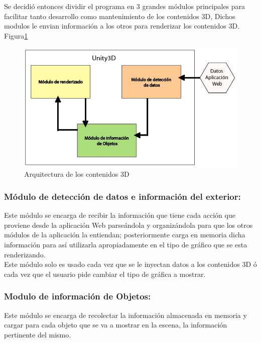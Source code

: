 \documentclass[twocolumn]{article}
\begin{document}
Se decidió entonces dividir el programa en 3 grandes módulos principales para facilitar tanto desarrollo como mantenimiento de los contenidos 3D, Dichos modulos le envian información a los otros para renderizar los contenidos 3D. Figura\ref{fig:modules}\\

\begin{figure}[h]
	\centering
		\includegraphics[scale=0.3]{ArquitecturaUnity.png}
		\caption{Arquitectura de los contenidos 3D}
	\label{fig:modules}
\end{figure}


\subsubsection{Módulo de detección de datos e información del exterior:}
Este módulo se encarga de recibir la información que tiene cada acción que proviene desde la aplicación Web parseándola y organizándola para que los otros módulos de la aplicación la entiendan; posteriormente carga en memoria dicha información para así utilizarla apropiadamente en el tipo de gráfico que se esta renderizando.\\

Este módulo solo es usado cada vez que se le inyectan datos a los contenidos 3D ó cada vez que el usuario pide cambiar el tipo de gráfica a mostrar.\\

\subsubsection{Modulo de información de Objetos:}
Este módulo se encarga de recolectar la información almacenada en memoria y cargar para cada objeto que se va a mostrar en la escena, la información pertinente del mismo.\\
\end{document}
